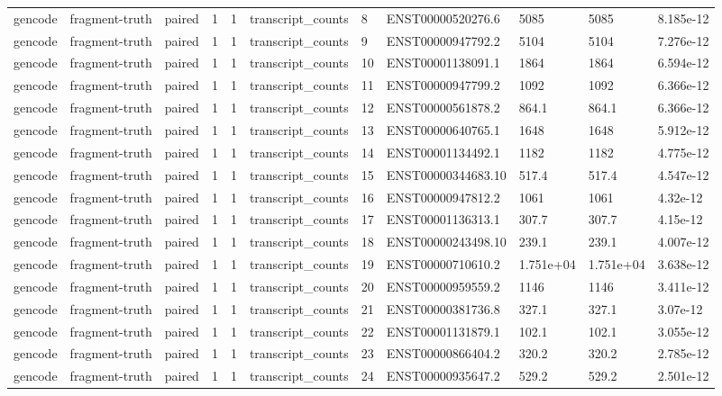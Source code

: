 \begin{tabular}{lllllllllll}
gencode & fragment-truth & paired & 1 & 1 & transcript\_counts & 8 & ENST00000520276.6 & 5085 & 5085 & 8.185e-12 \\
gencode & fragment-truth & paired & 1 & 1 & transcript\_counts & 9 & ENST00000947792.2 & 5104 & 5104 & 7.276e-12 \\
gencode & fragment-truth & paired & 1 & 1 & transcript\_counts & 10 & ENST00001138091.1 & 1864 & 1864 & 6.594e-12 \\
gencode & fragment-truth & paired & 1 & 1 & transcript\_counts & 11 & ENST00000947799.2 & 1092 & 1092 & 6.366e-12 \\
gencode & fragment-truth & paired & 1 & 1 & transcript\_counts & 12 & ENST00000561878.2 & 864.1 & 864.1 & 6.366e-12 \\
gencode & fragment-truth & paired & 1 & 1 & transcript\_counts & 13 & ENST00000640765.1 & 1648 & 1648 & 5.912e-12 \\
gencode & fragment-truth & paired & 1 & 1 & transcript\_counts & 14 & ENST00001134492.1 & 1182 & 1182 & 4.775e-12 \\
gencode & fragment-truth & paired & 1 & 1 & transcript\_counts & 15 & ENST00000344683.10 & 517.4 & 517.4 & 4.547e-12 \\
gencode & fragment-truth & paired & 1 & 1 & transcript\_counts & 16 & ENST00000947812.2 & 1061 & 1061 & 4.32e-12 \\
gencode & fragment-truth & paired & 1 & 1 & transcript\_counts & 17 & ENST00001136313.1 & 307.7 & 307.7 & 4.15e-12 \\
gencode & fragment-truth & paired & 1 & 1 & transcript\_counts & 18 & ENST00000243498.10 & 239.1 & 239.1 & 4.007e-12 \\
gencode & fragment-truth & paired & 1 & 1 & transcript\_counts & 19 & ENST00000710610.2 & 1.751e+04 & 1.751e+04 & 3.638e-12 \\
gencode & fragment-truth & paired & 1 & 1 & transcript\_counts & 20 & ENST00000959559.2 & 1146 & 1146 & 3.411e-12 \\
gencode & fragment-truth & paired & 1 & 1 & transcript\_counts & 21 & ENST00000381736.8 & 327.1 & 327.1 & 3.07e-12 \\
gencode & fragment-truth & paired & 1 & 1 & transcript\_counts & 22 & ENST00001131879.1 & 102.1 & 102.1 & 3.055e-12 \\
gencode & fragment-truth & paired & 1 & 1 & transcript\_counts & 23 & ENST00000866404.2 & 320.2 & 320.2 & 2.785e-12 \\
gencode & fragment-truth & paired & 1 & 1 & transcript\_counts & 24 & ENST00000935647.2 & 529.2 & 529.2 & 2.501e-12 \\

\end{tabular}

